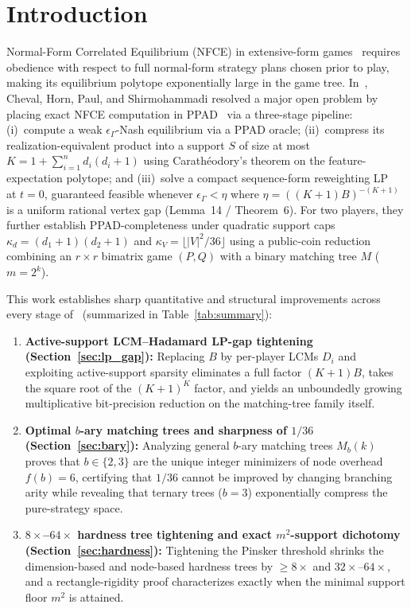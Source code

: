 \documentclass[11pt,a4paper]{article}
\theoremstyle{remark}
\begin{document}
\section{Introduction}\label{sec:intro}

Normal-Form Correlated Equilibrium (NFCE) in extensive-form games~\cite{vonStengelForges2008} requires obedience with respect to full normal-form strategy plans chosen prior to play, making its equilibrium polytope exponentially large in the game tree. In~\cite{CHPS2026}, Cheval, Horn, Paul, and Shirmohammadi resolved a major open problem by placing exact NFCE computation in PPAD~\cite{Papadimitriou1994,CDT2009} via a three-stage pipeline: (i)~compute a weak $\epsilon_\Gamma$-Nash equilibrium via a PPAD oracle; (ii)~compress its realization-equivalent product into a support $S$ of size at most $K = 1 + \sum_{i=1}^n d_i(d_i+1)$ using Carath\'eodory's theorem on the feature-expectation polytope; and (iii)~solve a compact sequence-form reweighting LP~\cite{KollerMegiddo1992,KMS1996} at $t=0$, guaranteed feasible whenever $\epsilon_\Gamma < \eta$ where $\eta = ((K+1)B)^{-(K+1)}$ is a uniform rational vertex gap (Lemma~14 / Theorem~6). For two players, they further establish PPAD-completeness under quadratic support caps $\kappa_d = (d_1+1)(d_2+1)$ and $\kappa_V = \lfloor |V|^2/36 \rfloor$ using a public-coin reduction combining an $r{\times}r$ bimatrix game $(P,Q)$ with a binary matching tree $M$ ($m = 2^k$).

This work establishes sharp quantitative and structural improvements across every stage of~\cite{CHPS2026} (summarized in Table~\ref{tab:summary}):
\begin{enumerate}
  \item \textbf{Active-support LCM--Hadamard LP-gap tightening (Section~\ref{sec:lp_gap}):} Replacing $B$ by per-player LCMs $D_i$ and exploiting active-support sparsity eliminates a full factor $(K+1)B$, takes the square root of the $(K+1)^K$ factor, and yields an unboundedly growing multiplicative bit-precision reduction on the matching-tree family itself.
  \item \textbf{Optimal $b$-ary matching trees and sharpness of $1/36$ (Section~\ref{sec:bary}):} Analyzing general $b$-ary matching trees $M_b(k)$ proves that $b \in \{2,3\}$ are the unique integer minimizers of node overhead $f(b) = 6$, certifying that $1/36$ cannot be improved by changing branching arity while revealing that ternary trees ($b=3$) exponentially compress the pure-strategy space.
  \item \textbf{$8\times$--$64\times$ hardness tree tightening and exact $m^2$-support dichotomy (Section~\ref{sec:hardness}):} Tightening the Pinsker threshold shrinks the dimension-based and node-based hardness trees by $\ge 8\times$ and $32\times$--$64\times$, and a rectangle-rigidity proof characterizes exactly when the minimal support floor $m^2$ is attained.
\end{enumerate}
\end{document}
